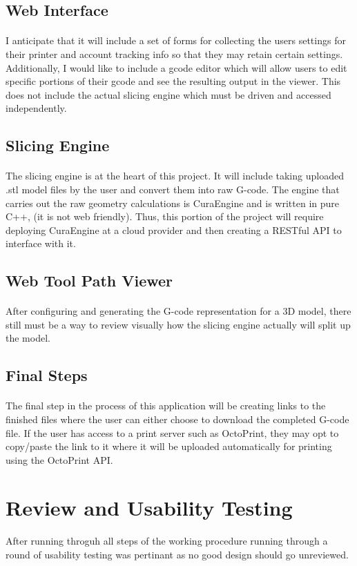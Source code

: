 \subsection{Web Interface}
\paragraph{}
I anticipate that it will include a set of forms for collecting the users settings for their printer and account tracking info so that they may retain certain settings. 
Additionally, I would like to include a gcode editor which will allow users to edit specific portions of their gcode and see the resulting output in the viewer. 
This does not include the actual slicing engine which must be driven and accessed independently.

\subsection{Slicing Engine}
\paragraph{}
The slicing engine is at the heart of this project. 
It will include taking uploaded .stl model files by the user and convert them into raw G-code. 
The engine that carries out the raw geometry calculations is CuraEngine and is written in pure C++, (it is not web friendly). 
Thus, this portion of the project will require deploying CuraEngine at a cloud provider and then creating a RESTful API to interface with it.

\subsection{Web Tool Path Viewer}
\paragraph{}
After configuring and generating the G-code representation for a 3D model, there still must be a way to review visually how the slicing engine actually will split up the model. 

\subsection{Final Steps}
\paragraph{}
The final step in the process of this application will be creating links to the finished files where the user can either choose to download the completed G-code file. 
If the user has access to a print server such as OctoPrint, they may opt to copy/paste the link to it where it will be uploaded automatically for printing using the OctoPrint API.

\section{Review and Usability Testing}
\paragraph{}
After running throguh all steps of the working procedure running through a round of usability testing was pertinant as no good design should go unreviewed.
